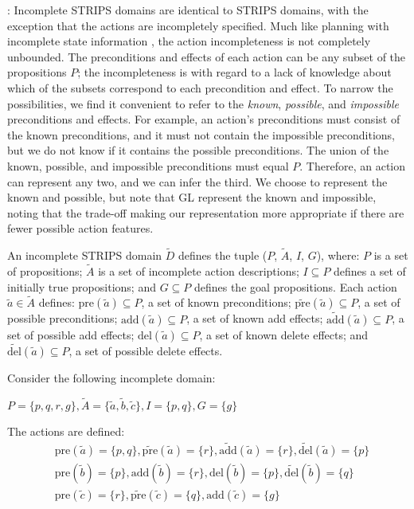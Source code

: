 \documentclass[letterpaper]{article}
\def\und#1{\noindent{\bf #1}:}
\def\citep#1{\cite{#1}}
\begin{document}
\und{Incomplete STRIPS Domains}
Incomplete STRIPS domains are identical to STRIPS domains, with the exception
that the actions are incompletely specified.  Much like planning with incomplete
state information \citep{pff,aij-mclug}, the action incompleteness is not
completely unbounded.  The preconditions and effects of each action can be any
subset of the propositions $P$; the incompleteness is with regard to a lack of
knowledge about which of the subsets correspond to each precondition and effect.
 To narrow the possibilities, we find it convenient to refer to the {\em known},
{\em possible}, and {\em impossible} preconditions and effects.  For example, an
action's preconditions must consist of the known preconditions, and it must not
contain the impossible preconditions, but we do not know if it contains the
possible preconditions.  The union of the known, possible, and impossible
preconditions must equal $P$. Therefore, an action can represent any two, and we
can infer the third.  We choose to represent the known and possible, but note
that GL represent the known and impossible, noting that the trade-off
making our representation more appropriate if there are fewer possible action features.

An incomplete STRIPS domain $\tilde{D}$  defines the tuple ($P$, $\tilde{A}$,
$I$, $G$), where: $P$ is a  set of propositions; $\tilde{A}$ is a set of
incomplete action descriptions; $I \subseteq P$ defines a set of initially true
propositions; and $G \subseteq P$ defines the goal propositions. Each action
$\tilde{a} \in \tilde{A}$ defines: $\text{pre}(\tilde{a}) \subseteq P$, a set of
known preconditions; $\widetilde{\text{pre}}(\tilde{a}) \subseteq P$, a set of
possible preconditions; $\text{add}(\tilde{a}) \subseteq P$, a set of known add
effects;  $\widetilde{\text{add}}(\tilde{a}) \subseteq P$, a set of possible add
effects; $\text{del}(\tilde{a}) \subseteq P$, a set of known delete effects; and
$\widetilde{\text{del}}(\tilde{a}) \subseteq P$, a set of possible delete
effects.

Consider the following incomplete domain: 

\noindent$P = \{p, q, r, g\},
\tilde{A} = \{\tilde{a}, \tilde{b}, \tilde{c}\},
I = \{p, q\},
G = \{g\}$

\noindent The actions are defined: 
\begin{align*}
&\text{pre}(\tilde{a}) = \{p, q\},\widetilde{\text{pre}}(\tilde{a})  = \{r\},
\widetilde{\text{add}}(\tilde{a}) = \{r\},  \widetilde{\text{del}}(\tilde{a}) = \{p\}\\ 
&\text{pre}(\tilde{b}) = \{p\}, \text{add}(\tilde{b}) = \{r\}, 
\text{del}(\tilde{b}) = \{p\}, \widetilde{\text{del}}(\tilde{b}) = \{q\}\\
&\text{pre}(\tilde{c}) = \{r\}, \widetilde{\text{pre}}(\tilde{c})  = \{q\},
\text{add}(\tilde{c}) = \{g\}
\end{align*}
\end{document}
